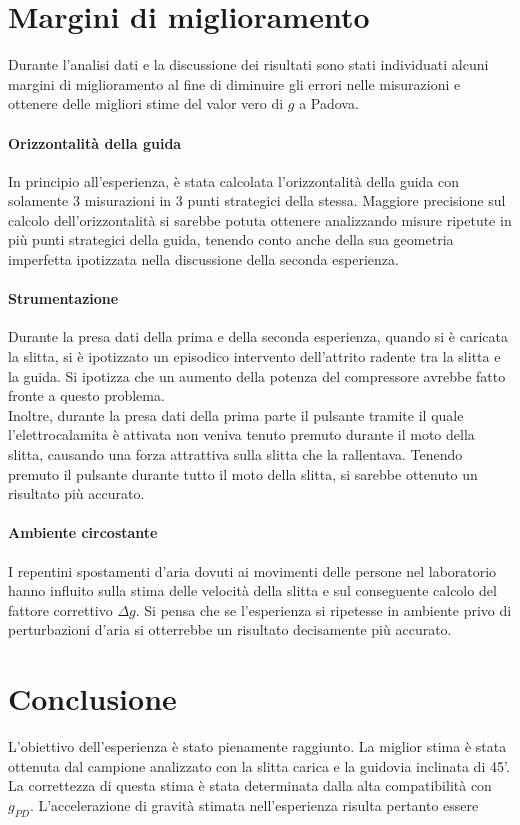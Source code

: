 \documentclass[a4paper,11pt,oneside]{article}
\begin{document}
\section{Margini di miglioramento}
Durante l'analisi dati e la discussione dei risultati sono stati individuati alcuni margini di miglioramento al fine di diminuire gli errori nelle misurazioni e ottenere delle migliori stime del valor vero di $g$ a Padova.

\paragraph{Orizzontalità della guida}

In principio all'esperienza, è stata calcolata l'orizzontalità della guida con solamente 3 misurazioni in 3 punti strategici della stessa. Maggiore precisione sul calcolo dell'orizzontalità si sarebbe potuta ottenere analizzando misure ripetute in più punti strategici della guida, tenendo conto anche della sua geometria imperfetta ipotizzata nella discussione della seconda esperienza.

\paragraph{Strumentazione}
Durante la presa dati della prima e della seconda esperienza, quando si è caricata la slitta, si è ipotizzato un episodico intervento dell'attrito radente tra la slitta e la guida. Si ipotizza che un aumento della potenza del compressore avrebbe fatto fronte a questo problema.\\
Inoltre, durante la presa dati della prima parte il pulsante tramite il quale l'elettrocalamita è attivata non veniva tenuto premuto durante il moto della slitta, causando una forza attrattiva sulla slitta che la rallentava. Tenendo premuto il pulsante durante tutto il moto della slitta, si sarebbe ottenuto un risultato più accurato.

\paragraph{Ambiente circostante}
I repentini spostamenti d'aria dovuti ai movimenti delle persone nel laboratorio hanno influito sulla stima delle velocità della slitta e sul conseguente calcolo del fattore correttivo $\Delta g$. Si pensa che se l'esperienza si ripetesse in ambiente privo di perturbazioni d'aria si otterrebbe un risultato decisamente più accurato.

\section{Conclusione}
L'obiettivo dell'esperienza è stato pienamente raggiunto. La miglior stima è stata ottenuta dal campione analizzato con la slitta carica e la guidovia inclinata di 45'. La correttezza di questa stima è stata determinata dalla alta compatibilità con $g_{PD}$. L'accelerazione di gravità stimata nell'esperienza risulta pertanto essere 
\end{document}
